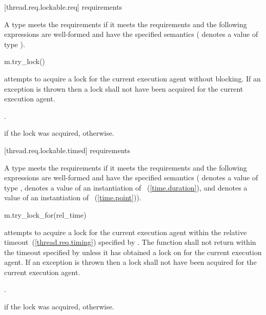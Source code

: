 [thread.req.lockable.req]{ requirements}

\pnum
A type  meets the  requirements if it meets the 
requirements and the following expressions are well-formed and have the specified semantics
( denotes a value of type ).

\begin{itemdecl}
m.try_lock()
\end{itemdecl}

\begin{itemdescr}
\pnum
\effects attempts to acquire a lock for the current execution agent without blocking. If an
exception is thrown then a lock shall not have been acquired for the current execution agent.

\pnum
\returntype {}.

\pnum
\returns {} if the lock was acquired,  otherwise.
\end{itemdescr}

[thread.req.lockable.timed]{ requirements}

\pnum
A type  meets the  requirements if it meets the 
requirements and the following expressions are well-formed and have the specified semantics
( denotes a value of type ,  denotes a value of an
instantiation of ~(\ref{time.duration}), and  denotes a value
of an instantiation of ~(\ref{time.point})).

\begin{itemdecl}
m.try_lock_for(rel_time)
\end{itemdecl}

\begin{itemdescr}
\pnum
\effects attempts to acquire a lock for the current execution agent within the relative
timeout~(\ref{thread.req.timing}) specified by . The function shall not return
within the timeout specified by  unless it has obtained a lock on 
for the current execution agent. If an exception is thrown then a lock shall not have been
acquired for the current execution agent.

\pnum
\returntype {}.

\pnum
\returns {} if the lock was acquired,  otherwise.
\end{itemdescr}

